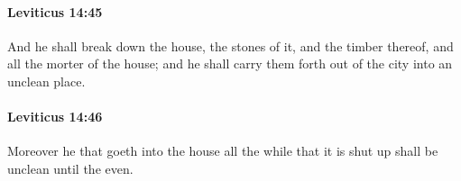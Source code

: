 		\paragraph{Leviticus 14:45} %
			\label{LEVITICUS-14-45}

			And he shall break down the house, the stones of it, and the timber thereof, and all the morter of the house; and he shall carry them forth out of the city into an unclean place.


		\paragraph{Leviticus 14:46} %
			\label{LEVITICUS-14-46}

			Moreover he that goeth into the house all the while that it is shut up shall be unclean until the even.


